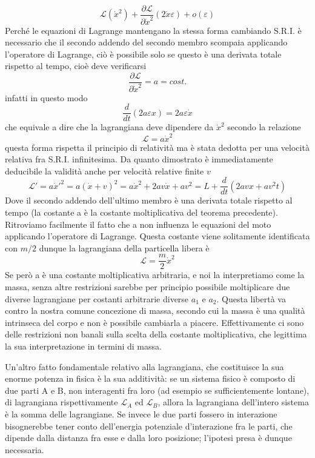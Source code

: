 \documentclass[
10pt, %
a4paper, %
oneside, %
headinclude,footinclude, %
BCOR5mm, %
]{scrartcl}
\begin{document}
\[ \mathcal{L}(\dot{x}^2) + \frac{\partial\mathcal{L}}{\partial\dot{x}^2}(2\dot{x}\varepsilon)+o(\varepsilon)\]
Perché le equazioni di Lagrange mantengano la stessa forma cambiando S.R.I. è necessario che il secondo addendo del secondo membro scompaia applicando l'operatore di Lagrange, ciò è possibile solo se questo è una derivata totale rispetto al tempo, cioè deve verificarsi
\[\frac{\partial\mathcal{L}}{\partial\dot{x}^2} = a = cost.\]
infatti in questo modo
\[\frac{d}{dt}(2a\varepsilon x) = 2a\varepsilon \dot{x}\]
che equivale a dire che la lagrangiana deve dipendere da $\dot{x}^2$ secondo la relazione 
\[\mathcal{L} = a \dot{x}^2\]
questa forma rispetta il principio di relatività ma è stata dedotta per una velocità relativa fra S.R.I. infinitesima. Da quanto dimostrato è immediatamente deducibile la validità anche per velocità relative finite $v$
\[\mathcal{L}' = a\dot{x}'^2 = a (\dot{x}+v)^2= a\dot{x}^2+2av\dot{x}+av^2= L+\frac{d}{dt}(2av x+av^2t)\]
Dove il secondo addendo dell'ultimo membro è una derivata totale rispetto al tempo (la costante a è la costante moltiplicativa del teorema precedente). Ritroviamo facilmente il fatto che a non influenza le equazioni del moto applicando l'operatore di Lagrange. Questa costante viene solitamente identificata con \(m/2\) dunque la lagrangiana della particella libera è
\[\mathcal{L} = \frac{m}{2}\dot{x}^2\]
Se però a è una costante moltiplicativa arbitraria, e noi la interpretiamo come la massa, senza altre restrizioni sarebbe per principio possibile moltiplicare due diverse lagrangiane per costanti arbitrarie diverse \(a_1\) e \(a_2\). Questa libertà va contro la nostra comune concezione di massa, secondo cui la massa è una qualità intrinseca del corpo e non è possibile cambiarla a piacere. Effettivamente ci sono delle restrizioni non banali sulla scelta della costante moltiplicativa, che legittima la sua interpretazione in termini di massa.
\begin{osservazione}
	Un'altro fatto fondamentale relativo alla lagrangiana, che costituisce la sua enorme potenza in fisica è la sua additività: se un sistema fisico è composto di due parti A e B, non interagenti fra loro (ad esempio se sufficientemente lontane), di lagrangiana rispettivamente \(\mathcal{L}_A\) ed \(\mathcal{L}_B\), allora la lagrangiana dell'intero sistema è la somma delle lagrangiane. Se invece le due parti fossero in interazione bisognerebbe tener conto dell'energia potenziale d'interazione fra le parti, che dipende dalla distanza fra esse e dalla loro posizione; l'ipotesi presa è dunque necessaria. 
\end{osservazione}
\end{document}
